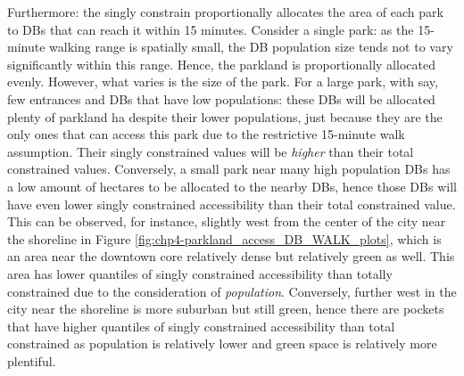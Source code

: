 \documentclass[
11pt, %
oneside, %
english, %
singlespacing, %
]{macthesis} %
\begin{document}
Furthermore: the singly constrain proportionally allocates the area of each park to DBs that can reach it within 15 minutes. Consider a single park: as the 15-minute walking range is spatially small, the DB population size tends not to vary significantly within this range. Hence, the parkland is proportionally allocated evenly. However, what varies is the size of the park. For a large park, with say, few entrances and DBs that have low populations: these DBs will be allocated plenty of parkland ha despite their lower populations, just because they are the only ones that can access this park due to the restrictive 15-minute walk assumption. Their singly constrained values will be \emph{higher} than their total constrained values. Conversely, a small park near many high population DBs has a low amount of hectares to be allocated to the nearby DBs, hence those DBs will have even lower singly constrained accessibility than their total constrained value. This can be observed, for instance, slightly west from the center of the city near the shoreline in Figure \ref{fig:chp4-parkland_access_DB_WALK_plots}, which is an area near the downtown core relatively dense but relatively green as well. This area has lower quantiles of singly constrained accessibility than totally constrained due to the consideration of \emph{population}. Conversely, further west in the city near the shoreline is more suburban but still green, hence there are pockets that have higher quantiles of singly constrained accessibility than total constrained as population is relatively lower and green space is relatively more plentiful.
\end{document}
